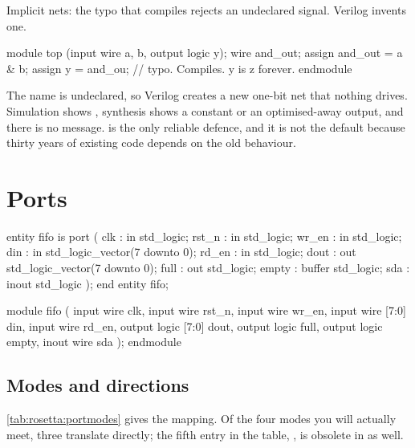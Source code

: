 \begin{gotcha}{Implicit nets: the typo that compiles}
\VHDL{} rejects an undeclared signal. Verilog invents one.
\begin{svcode}
module top (input wire a, b, output logic y);
  wire and_out;
  assign and_out = a & b;
  assign y       = and_ou;    // typo. Compiles. y is z forever.
endmodule
\end{svcode}
The name  is undeclared, so Verilog creates a new one-bit net that
nothing drives. Simulation shows , synthesis shows a constant or an
optimised-away output, and there is no message. 
is the only reliable defence, and it is not the default because thirty years of
existing code depends on the old behaviour.
\end{gotcha}

\section{Ports}
\label{sec:rosetta:ports}

\begin{rosetta}
\begin{rleft}
entity fifo is
  port (
    clk   : in  std_logic;
    rst_n : in  std_logic;
    wr_en : in  std_logic;
    din   : in  std_logic_vector(7 downto 0);
    rd_en : in  std_logic;
    dout  : out std_logic_vector(7 downto 0);
    full  : out std_logic;
    empty : buffer std_logic;
    sda   : inout  std_logic
  );
end entity fifo;
\end{rleft}
\begin{rright}
module fifo (
  input  wire        clk,
  input  wire        rst_n,
  input  wire        wr_en,
  input  wire  [7:0] din,
  input  wire        rd_en,
  output logic [7:0] dout,
  output logic       full,
  output logic       empty,
  inout  wire        sda
);
endmodule
\end{rright}
\end{rosetta}


\subsection{Modes and directions}

\cref{tab:rosetta:portmodes} gives the mapping. Of the four modes you will
actually meet, three translate directly; the fifth entry in the table,
, is obsolete in \VHDL{} as well.


